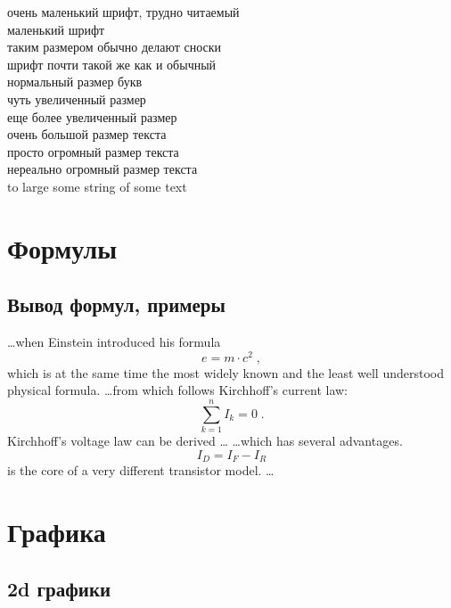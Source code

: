 \documentclass[a4paper,14pt]{book}
\begin{document}
\tiny очень маленький шрифт, трудно читаемый \\
\scriptsize маленький шрифт \\
\footnotesize таким размером обычно делают сноски \\
\small шрифт почти такой же как и обычный \\
\normalsize нормальный размер букв \\
\large чуть увеличенный размер \\
\Large еще более увеличенный размер \\
\LARGE очень большой размер текста \\
\huge просто огромный размер текста \\
\Huge нереально огромный размер текста \\
\Huge to large some string of some text \\
\normalsize

\section{Формулы}

\subsection{Вывод формул, примеры}
\ldots when Einstein introduced his formula
\begin{equation}
	e = m \cdot c^2 \; ,
\end{equation}
which is at the same time the most widely known
and the least well understood physical formula.
\ldots from which follows Kirchhoff's current law:
\begin{equation}
	\sum_{k=1}^{n} I_k = 0 \; .
\end{equation}
Kirchhoff's voltage law can be derived \ldots
\ldots which has several advantages.
\begin{equation}
	I_D = I_F - I_R
\end{equation}
is the core of a very different transistor model. \ldots

\section{Графика}

\subsection{2d графики}
\end{document}
